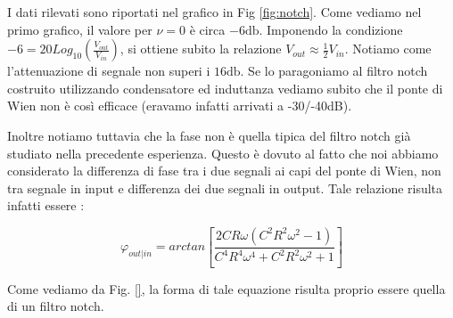 I dati rilevati sono riportati nel grafico in Fig \ref{fig:notch}. Come vediamo nel primo grafico, il valore per $\nu=0$ è circa $-6 \si{\decibel}$. Imponendo la condizione $-6=20Log_{10}(\frac{V_{out}}{V_{in}})$, si ottiene subito la relazione $V_{out} \approx \frac{1}{2} V_{in}$. Notiamo come l'attenuazione di segnale non superi i $16 \si{\decibel}$. Se lo paragoniamo al filtro notch costruito utilizzando condensatore ed induttanza vediamo subito che il ponte di Wien non è così efficace (eravamo infatti arrivati a -30/-40dB). 

Inoltre notiamo tuttavia che la fase non è quella tipica del filtro notch già studiato nella precedente esperienza. Questo è dovuto al fatto che noi abbiamo considerato la differenza di fase tra i due segnali ai capi del ponte di Wien, non tra segnale in input e differenza dei due segnali in output. Tale relazione risulta infatti essere :

\begin{equation}
\varphi_{out|in}=arctan[\frac{2 C R \omega \left(C^2 R^2 \omega^2-1\right)}{C^4 R^4 \omega^4+C^2 R^2 \omega^2+1}]
\end{equation}

\pagebreak

Come vediamo da Fig. \ref{}, la forma di tale equazione risulta proprio essere quella di un filtro notch.




